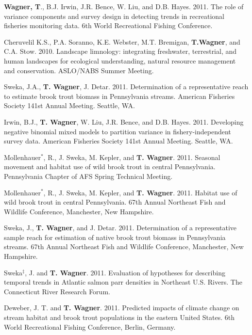\documentclass[10pt]{article}
\begin{document}
\begin{flushleft}
\begin{etaremune}
\item {\bf Wagner, T}., B.J. Irwin, J.R. Bence, W. Liu, and D.B. Hayes. 2011. The role of variance components and survey design in detecting trends in recreational fisheries monitoring data. 6th World Recreational Fishing Conference. 

\item Cheruvelil K.S., P.A. Soranno, K.E. Webster, M.T. Bremigan, {\bf T.Wagner}, and C.A. Stow. 2010. Landscape limnology: integrating freshwater, terrestrial, and human landscapes for ecological understanding, natural resource management and conservation. ASLO/NABS Summer Meeting.

\item Sweka, J.A., {\bf T. Wagner}, J. Detar. 2011. Determination of a representative reach to estimate brook trout biomass in Pennsylvania streams. American Fisheries Society 141st Annual Meeting. Seattle, WA.

\item Irwin, B.J., {\bf T. Wagner}, W. Liu, J.R. Bence, and D.B. Hayes. 2011. Developing negative binomial mixed models to partition variance in fishery-independent survey data. American Fisheries Society 141st Annual Meeting. Seattle, WA.

\item Mollenhauer$^*$, R., J. Sweka, M. Kepler, and  {\bf T. Wagner}. 2011. Seasonal movement and habitat use of wild brook trout in central Pennsylvania. Pennsylvania Chapter of AFS Spring Technical Meeting.

\item Mollenhauer$^*$, R., J. Sweka, M. Kepler, and  {\bf T. Wagner}. 2011. Habitat use of wild brook trout in central Pennsylvania. 67th Annual Northeast Fish and Wildlife Conference, Manchester, New Hampshire.

\item Sweka, J.,  {\bf T. Wagner}, and J. Detar. 2011. Determination of a representative sample reach for estimation of native brook trout biomass in Pennsylvania streams. 67th Annual Northeast Fish and Wildlife Conference, Manchester, New Hampshire.

\item Sweka$^\ddagger$, J. and  {\bf T. Wagner}. 2011. Evaluation of hypotheses for describing temporal trends in Atlantic salmon parr densities in Northeast U.S. Rivers. The Connecticut River Research Forum.

\item Deweber, J. T. and {\bf T. Wagner}. 2011. Predicted impacts of climate change on stream habitat and brook trout populations in the eastern United States. 6th World Recreational Fishing Conference, Berlin, Germany.



\end{etaremune}
\end{flushleft}
\end{document}
